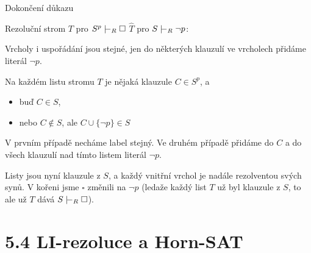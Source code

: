 \documentclass{beamer}
\begin{document}
\begin{frame}{Dokončení důkazu}

    Rezoluční strom \alert{$T$ pro $S^p\proves_R\square$} \scalebox{1.5}{$\rightsquigarrow$} \alert{$\widehat T$ pro $S\proves_R \neg p$}: 
    
    Vrcholy i uspořádání jsou stejné, jen do některých klauzulí ve vrcholech \alert{přidáme literál $\neg p$}. 
    
    Na každém listu stromu $T$ je nějaká klauzule $C\in S^p$, a
    \begin{itemize}
        \item buď $C\in S$,
        \item nebo $C\notin S$, ale $C\cup\{\neg p\}\in S$
    \end{itemize}
    
    V prvním případě necháme label stejný. Ve druhém případě přidáme do $C$ \alert{a do všech klauzulí nad tímto listem} literál $\neg p$. 
    
    Listy jsou nyní klauzule z $S$, a každý vnitřní vrchol je nadále rezolventou svých synů. V kořeni jsme $\square$ změnili na $\neg p$ (ledaže každý list $T$ už byl klauzule z $S$, to ale už $T$ dává $S\proves_R\square$). \hfill\qedsymbol

\end{frame}


\section{5.4 LI-rezoluce a Horn-SAT}
\end{document}
